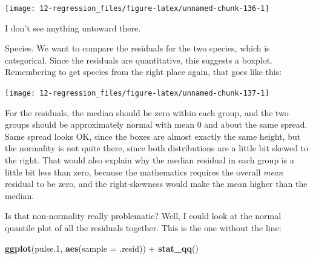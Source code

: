 \documentclass[]{tufte-book}
\newenvironment{Shaded}{}{}
\newcommand{\DataTypeTok}[1]{\textcolor[rgb]{0.56,0.13,0.00}{#1}}
\newcommand{\FloatTok}[1]{\textcolor[rgb]{0.25,0.63,0.44}{#1}}
\newcommand{\KeywordTok}[1]{\textcolor[rgb]{0.00,0.44,0.13}{\textbf{#1}}}
\newcommand{\NormalTok}[1]{#1}
\newcommand{\OperatorTok}[1]{\textcolor[rgb]{0.40,0.40,0.40}{#1}}
\newcommand{\StringTok}[1]{\textcolor[rgb]{0.25,0.44,0.63}{#1}}
\theoremstyle{definition}
\theoremstyle{definition}
\theoremstyle{definition}
\theoremstyle{remark}
\begin{document}
\begin{Shaded}
\end{Shaded}

\texttt{[image: 12-regression\_files/figure-latex/unnamed-chunk-136-1]}

I don't see anything untoward there.

Species. We want to compare the residuals for the two species, which is
categorical. Since the residuals are quantitative, this suggests a
boxplot. Remembering to get species from the right place again, that
goes like this:

\begin{Shaded}
\end{Shaded}

\texttt{[image: 12-regression\_files/figure-latex/unnamed-chunk-137-1]}

For the residuals, the median should be zero within each group, and the
two groups should be approximately normal with mean 0 and about the same
spread. Same spread looks OK, since the boxes are almost exactly the
same height, but the normality is not quite there, since both
distributions are a little bit skewed to the right. That would also
explain why the median residual in each group is a little bit less than
zero, because the mathematics requires the overall \emph{mean} residual
to be zero, and the right-skewness would make the mean higher than the
median.

Is that non-normality really problematic? Well, I could look at the
normal quantile plot of all the residuals together. This is the one
without the line:

\begin{Shaded}
\begin{Highlighting}[]
\KeywordTok{ggplot}\NormalTok{(pulse}\FloatTok{.1}\NormalTok{, }\KeywordTok{aes}\NormalTok{(}\DataTypeTok{sample =}\NormalTok{ .resid)) }\OperatorTok{+}\StringTok{ }\KeywordTok{stat_qq}\NormalTok{()}
\end{Highlighting}
\end{Shaded}
\end{document}
